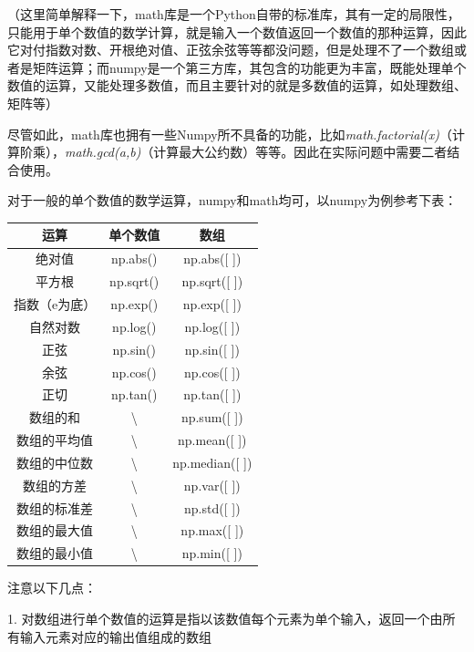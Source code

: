 \documentclass[12pt]{article}
\begin{document}
\noindent（这里简单解释一下，math库是一个Python自带的标准库，其有一定的局限性，只能用于单个数值的数学计算，就是输入一个数值返回一个数值的那种运算，因此它对付指数对数、开根绝对值、正弦余弦等等都没问题，但是处理不了一个数组或者是矩阵运算；而numpy是一个第三方库，其包含的功能更为丰富，既能处理单个数值的运算，又能处理多数值，而且主要针对的就是多数值的运算，如处理数组、矩阵等）

尽管如此，math库也拥有一些Numpy所不具备的功能，比如\textit{math.factorial(x)}（计算阶乘），\textit{math.gcd(a,b)}（计算最大公约数）等等。因此在实际问题中需要二者结合使用。

对于一般的单个数值的数学运算，numpy和math均可，以numpy为例参考下表：
\begin{table}[H]
\centering
\begin{tabular}{|c|c|c|}
\hline
运算      & 单个数值             & 数组                \\ \hline
绝对值     & np.abs()         & np.abs({[} {]})    \\ \hline
平方根     & np.sqrt()        & np.sqrt({[} {]})   \\ \hline
指数（e为底） & np.exp()         & np.exp({[} {]})    \\ \hline
自然对数    & np.log()         & np.log({[} {]})    \\ \hline
正弦      & np.sin()         & np.sin({[} {]})    \\ \hline
余弦      & np.cos()         & np.cos({[} {]})    \\ \hline
正切      & np.tan()         & np.tan({[} {]})    \\ \hline
数组的和    & \textbackslash{} & np.sum({[} {]})    \\ \hline
数组的平均值  & \textbackslash{} & np.mean({[} {]})   \\ \hline
数组的中位数  & \textbackslash{} & np.median({[} {]}) \\ \hline
数组的方差   & \textbackslash{} & np.var({[} {]})    \\ \hline
数组的标准差  & \textbackslash{} & np.std({[} {]})    \\ \hline
数组的最大值  & \textbackslash{} & np.max({[} {]})    \\ \hline
数组的最小值  & \textbackslash{} & np.min({[} {]})    \\ \hline
\end{tabular}
\end{table}

\noindent 注意以下几点：

1. 对数组进行单个数值的运算是指以该数值每个元素为单个输入，返回一个由所有输入元素对应的输出值组成的数组
\end{document}
